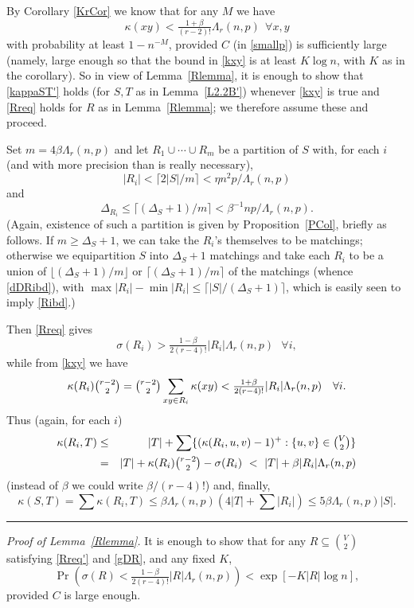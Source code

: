 \documentclass[letterpaper,11pt]{article}
\newcommand{\beq}[1]{\begin{equation}\label{#1}}
\newcommand{\enq}[0]{\end{equation}}
\newcommand{\mn}[0]{\medskip\noindent}
\newcommand{\sub}[0]{\subseteq}
\newcommand{\0}[0]{\emptyset}
\renewcommand{\qed}[0]{\begin{flushright} \rule{2mm}{3mm} \end{flushright}}
\newcommand{\C}[2]{{{#1}\choose{{#2}}}}
\newcommand{\Cc}[0]{\tbinom}
\newcommand{\gb}[0]{\beta }
\newcommand{\gD}[0]{\Delta }
\newcommand{\gL}[0]{\Lambda}
\newcommand{\gs}[0]{\sigma}
\newcommand{\vr}[0]{\varrho}
\newcommand{\glr}[0]{\gL_r(n,p)}
\begin{document}
By Corollary \ref{KrCor} we know that for any $M$ we have
\beq{kxy}
\kappa(xy) <\tfrac{1+ \gb}{(r-2)!} \gL_r(n,p)  ~~\forall x,y
\enq
with probability at least $1-n^{-M}$, provided $C$
(in \eqref{smallp}) is sufficiently large
(namely, large enough so that the bound in \eqref{kxy} is at least
$K\log n$,
with $K$ as in the corollary).
%
So in view of Lemma~\ref{Rlemma}, it is enough to show
that
\eqref{kappaST'}
holds (for $S,T$ as in Lemma~\ref{L2.2B'}) %
whenever \eqref{kxy} is true and
\eqref{Rreq} holds for $R$ as in
Lemma~\ref{Rlemma}; we therefore assume these and proceed.




Set $m=4\gb \gL_r(n,p)$ and
let $R_1\cup \cdots \cup R_m$ be a partition of $S$
with, for each $i$ (and with more precision than is really necessary),
\beq{Ribd}
|R_i|<\lceil 2|S|/m \rceil< \eta n^2p/\glr
\enq
and
\beq{dDRibd}
\gD_{R_i}\leq \lceil(\gD_S+1)/m\rceil
<\gb^{-1}np/ \gL_r(n,p).
\enq
(Again, existence of such a partition is given by Proposition~\ref{PCol}, briefly
as follows.
If $m\geq \gD_S+1$, we can take the $R_i$'s themselves to be matchings;
otherwise
we equipartition $S$ into $\gD_S+1$ matchings and take each $R_i$ to be a union of
$\lfloor (\gD_S+1)/m\rfloor$ or $\lceil (\gD_S+1)/m\rceil$ of the matchings
(whence \eqref{dDRibd}),
with $\max|R_i|-\min|R_i|\leq \lceil |S|/(\gD_S+1)\rceil$,
which is easily seen to imply \eqref{Ribd}.)

Then \eqref{Rreq} gives
\[
\gs(R_i) > \tfrac{1- \gb}{2(r-4)!} |R_i|\gL_r(n,p)
~~~\forall i,
\]
while from \eqref{kxy} we have
\[ %
\kappa(R_i) \Cc{r-2}{2} = \Cc{r-2}{2}\sum_{xy\in R_i}\kappa(xy)
<
\tfrac{1+ \gb}{2(r-4)!} |R_i|
\gL_r(n,p)  ~~~\forall i.
\] %
%
Thus (again, for each $i$)
\begin{eqnarray*}
\kappa(R_i,T)
&\leq &
|T|+ \sum\{(\kappa(R_i,u,v)-1)^+:\{u,v\}\in\Cc{V}{2}\}
\\
&=&
|T| + \kappa(R_i) \Cc{r-2}{2} - \gs(R_i)
~< ~|T| + \gb|R_i|\gL_r(n,p)
\end{eqnarray*}
%
(instead of $\gb$ we could write $\gb/(r-4)!$) and, finally,
\[
\kappa(S,T) = \sum\kappa(R_i,T)
\leq \gb \gL_r(n,p)(4|T| + \sum |R_i|) \leq 5\gb \gL_r(n,p)|S|.
\]\qed
%




\mn
{\em Proof of Lemma~\ref{Rlemma}.}
It is enough to show that for any $R\sub \C{V}{2}$
satisfying \eqref{Rreq'} and \eqref{gDR},
and any fixed $K$,
\beq{gsRtoshow}
\Pr(\gs(R)< \tfrac{1- \gb}{2(r-4)!} |R|\gL_r(n,p))
< \exp [- K |R|\log n],
\enq
provided $C$ is large enough.
\end{document}
